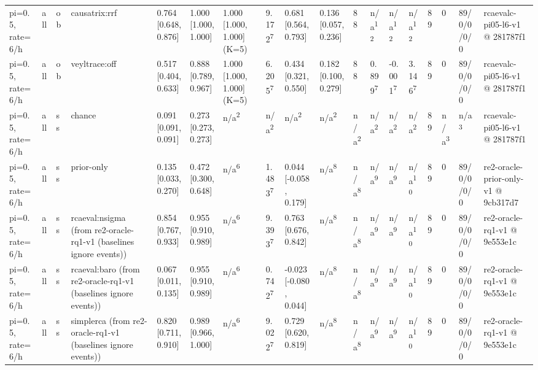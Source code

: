 \begin{table}[t]
\begin{tabular}{llllllllllllllllll}
pi=0.5, rate=6/h & all & ob & causatrix:rrf & 0.764 [0.648, 0.876] & 1.000 [1.000, 1.000] & 1.000 [1.000, 1.000] (K=5) & 9.172\textsuperscript{7} & 0.681 [0.564, 0.793] & 0.136 [0.057, 0.236] & 88 & n/a\textsuperscript{12} & n/a\textsuperscript{12} & n/a\textsuperscript{12} & 89 & 0 & 89/0/0/0/0 & rcaevalc-pi05-l6-v1 @ 281787f1 \\
pi=0.5, rate=6/h & all & ob & veyltrace:off & 0.517 [0.404, 0.633] & 0.888 [0.789, 0.967] & 1.000 [1.000, 1.000] (K=5) & 6.205\textsuperscript{7} & 0.434 [0.321, 0.550] & 0.182 [0.100, 0.279] & 88 & 0.899\textsuperscript{7} & -0.001\textsuperscript{7} & 3.146\textsuperscript{7} & 89 & 0 & 89/0/0/0/0 & rcaevalc-pi05-l6-v1 @ 281787f1 \\
pi=0.5, rate=6/h & all & ss & chance & 0.091 [0.091, 0.091] & 0.273 [0.273, 0.273] & n/a\textsuperscript{2} & n/a\textsuperscript{2} & n/a\textsuperscript{2} & n/a\textsuperscript{2} & n/a\textsuperscript{2} & n/a\textsuperscript{2} & n/a\textsuperscript{2} & n/a\textsuperscript{2} & 89 & n/a\textsuperscript{3} & n/a\textsuperscript{3} & rcaevalc-pi05-l6-v1 @ 281787f1 \\
pi=0.5, rate=6/h & all & ss & prior-only & 0.135 [0.033, 0.270] & 0.472 [0.300, 0.648] & n/a\textsuperscript{6} & 1.483\textsuperscript{7} & 0.044 [-0.058, 0.179] & n/a\textsuperscript{8} & n/a\textsuperscript{8} & n/a\textsuperscript{9} & n/a\textsuperscript{9} & n/a\textsuperscript{10} & 89 & 0 & 89/0/0/0/0 & re2-oracle-prior-only-v1 @ 9cb317d7 \\
pi=0.5, rate=6/h & all & ss & rcaeval:nsigma (from re2-oracle-rq1-v1 (baselines ignore events)) & 0.854 [0.767, 0.933] & 0.955 [0.910, 0.989] & n/a\textsuperscript{6} & 9.393\textsuperscript{7} & 0.763 [0.676, 0.842] & n/a\textsuperscript{8} & n/a\textsuperscript{8} & n/a\textsuperscript{9} & n/a\textsuperscript{9} & n/a\textsuperscript{10} & 89 & 0 & 89/0/0/0/0 & re2-oracle-rq1-v1 @ 9e553e1c \\
pi=0.5, rate=6/h & all & ss & rcaeval:baro (from re2-oracle-rq1-v1 (baselines ignore events)) & 0.067 [0.011, 0.135] & 0.955 [0.910, 0.989] & n/a\textsuperscript{6} & 0.742\textsuperscript{7} & -0.023 [-0.080, 0.044] & n/a\textsuperscript{8} & n/a\textsuperscript{8} & n/a\textsuperscript{9} & n/a\textsuperscript{9} & n/a\textsuperscript{10} & 89 & 0 & 89/0/0/0/0 & re2-oracle-rq1-v1 @ 9e553e1c \\
pi=0.5, rate=6/h & all & ss & simplerca (from re2-oracle-rq1-v1 (baselines ignore events)) & 0.820 [0.711, 0.910] & 0.989 [0.966, 1.000] & n/a\textsuperscript{6} & 9.022\textsuperscript{7} & 0.729 [0.620, 0.819] & n/a\textsuperscript{8} & n/a\textsuperscript{8} & n/a\textsuperscript{9} & n/a\textsuperscript{9} & n/a\textsuperscript{10} & 89 & 0 & 89/0/0/0/0 & re2-oracle-rq1-v1 @ 9e553e1c \\

\end{tabular}
\end{table}
